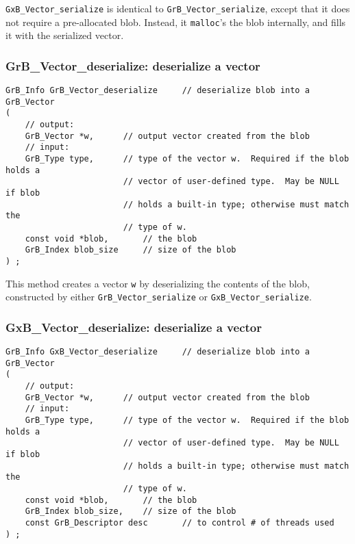 \documentclass[12pt]{article}
\begin{document}
\verb'GxB_Vector_serialize' is identical to \verb'GrB_Vector_serialize', except
that it does not require a pre-allocated blob.  Instead, it \verb'malloc''s the
blob internally, and fills it with the serialized vector.

\newpage
\subsubsection{{\sf GrB\_Vector\_deserialize:}    deserialize a vector}
\label{vector_deserialize}

\begin{mdframed}[userdefinedwidth=6in]
{\footnotesize
\begin{verbatim}
GrB_Info GrB_Vector_deserialize     // deserialize blob into a GrB_Vector
(
    // output:
    GrB_Vector *w,      // output vector created from the blob
    // input:
    GrB_Type type,      // type of the vector w.  Required if the blob holds a
                        // vector of user-defined type.  May be NULL if blob
                        // holds a built-in type; otherwise must match the
                        // type of w.
    const void *blob,       // the blob
    GrB_Index blob_size     // size of the blob
) ;
\end{verbatim}
} \end{mdframed}

This method creates a vector \verb'w' by deserializing the contents of the
blob, constructed by either \verb'GrB_Vector_serialize' or
\verb'GxB_Vector_serialize'.

\subsubsection{{\sf GxB\_Vector\_deserialize:}    deserialize a vector}
\label{vector_deserialize_GxB}

\begin{mdframed}[userdefinedwidth=6in]
{\footnotesize
\begin{verbatim}
GrB_Info GxB_Vector_deserialize     // deserialize blob into a GrB_Vector
(
    // output:
    GrB_Vector *w,      // output vector created from the blob
    // input:
    GrB_Type type,      // type of the vector w.  Required if the blob holds a
                        // vector of user-defined type.  May be NULL if blob
                        // holds a built-in type; otherwise must match the
                        // type of w.
    const void *blob,       // the blob
    GrB_Index blob_size,    // size of the blob
    const GrB_Descriptor desc       // to control # of threads used
) ;
\end{verbatim}
} \end{mdframed}
\end{document}
